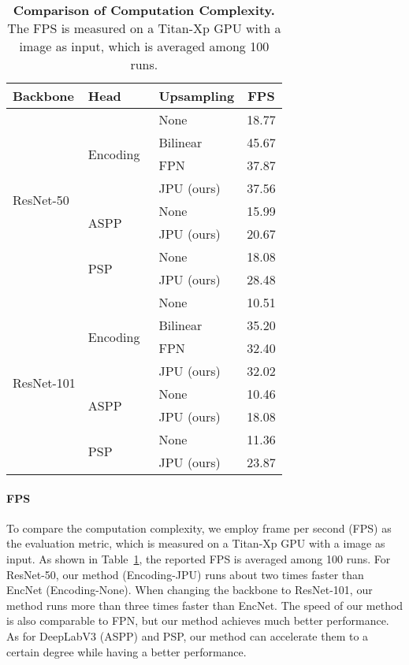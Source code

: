 \documentclass[10pt,twocolumn,letterpaper]{article}
\begin{document}
\begin{table}
\begin{center}
\begin{tabular}{l|l|l|c}
\hline
Backbone & Head & Upsampling & FPS\\
\hline
\multirow{8}{*}{ResNet-50} & \multirow{4}{*}{Encoding~\cite{zhang2018context}} & None & 18.77\\
 &  & Bilinear & \cellcolor{First}45.67\\
 &  & FPN~\cite{lin2017feature} & \cellcolor{Second}37.87\\
 &  & JPU (ours) & \cellcolor{Third}37.56\\
\cline{2-4}
 & \multirow{2}{*}{ASPP~\cite{chen2017rethinking}} & None & 15.99\\
 & & JPU (ours) & 20.67\\
\cline{2-4}
 & \multirow{2}{*}{PSP~\cite{zhao2017pyramid}} & None & 18.08\\
 &  & JPU (ours) & 28.48\\
\hline
\hline
\multirow{8}{*}{ResNet-101} & \multirow{4}{*}{Encoding~\cite{zhang2018context}} & None & 10.51\\
 & & Bilinear & \cellcolor{First}35.20\\
 & & FPN~\cite{lin2017feature} & \cellcolor{Second}32.40\\
 & & JPU (ours) & \cellcolor{Third}32.02\\
\cline{2-4}
 & \multirow{2}{*}{ASPP~\cite{chen2017rethinking}} & None & 10.46\\
 &  & JPU (ours) & 18.08\\
\cline{2-4}
 & \multirow{2}{*}{PSP~\cite{zhao2017pyramid}} & None & 11.36\\
 &  & JPU (ours) & 23.87\\ 
\hline
\end{tabular}
\end{center}
	\caption{\textbf{Comparison of Computation Complexity.} The FPS is measured on a Titan-Xp GPU with a  image as input, which is averaged among 100 runs.}
	\label{table:speed}
\end{table}
\vspace{-1em}
\paragraph{FPS}
To compare the computation complexity, we employ frame per second (FPS) as the evaluation metric, which is measured on a Titan-Xp GPU with a  image as input.
As shown in Table~\ref{table:speed}, the reported FPS is averaged among 100 runs.
For ResNet-50, our method (Encoding-JPU) runs about two times faster than EncNet (Encoding-None).
When changing the backbone to ResNet-101, our method runs more than three times faster than EncNet.
The speed of our method is also comparable to FPN, but our method achieves much better performance.
As for DeepLabV3 (ASPP) and PSP, our method can accelerate them to a certain degree while having a better performance.
\end{document}
